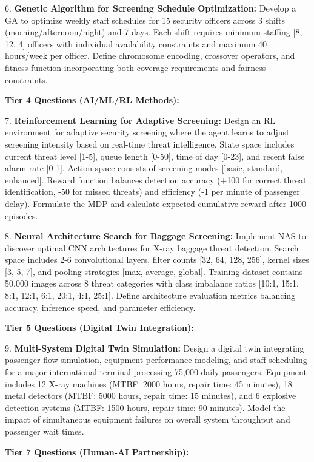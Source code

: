 \documentclass{article}
\begin{document}
6. \textbf{Genetic Algorithm for Screening Schedule Optimization:} Develop a GA to optimize weekly staff schedules for 15 security officers across 3 shifts (morning/afternoon/night) and 7 days. Each shift requires minimum staffing [8, 12, 4] officers with individual availability constraints and maximum 40 hours/week per officer. Define chromosome encoding, crossover operators, and fitness function incorporating both coverage requirements and fairness constraints.

\textbf{Tier 4 Questions (AI/ML/RL Methods):}

7. \textbf{Reinforcement Learning for Adaptive Screening:} Design an RL environment for adaptive security screening where the agent learns to adjust screening intensity based on real-time threat intelligence. State space includes current threat level [1-5], queue length [0-50], time of day [0-23], and recent false alarm rate [0-1]. Action space consists of screening modes [basic, standard, enhanced]. Reward function balances detection accuracy (+100 for correct threat identification, -50 for missed threats) and efficiency (-1 per minute of passenger delay). Formulate the MDP and calculate expected cumulative reward after 1000 episodes.

8. \textbf{Neural Architecture Search for Baggage Screening:} Implement NAS to discover optimal CNN architectures for X-ray baggage threat detection. Search space includes 2-6 convolutional layers, filter counts [32, 64, 128, 256], kernel sizes [3, 5, 7], and pooling strategies [max, average, global]. Training dataset contains 50,000 images across 8 threat categories with class imbalance ratios [10:1, 15:1, 8:1, 12:1, 6:1, 20:1, 4:1, 25:1]. Define architecture evaluation metrics balancing accuracy, inference speed, and parameter efficiency.

\textbf{Tier 5 Questions (Digital Twin Integration):}

9. \textbf{Multi-System Digital Twin Simulation:} Design a digital twin integrating passenger flow simulation, equipment performance modeling, and staff scheduling for a major international terminal processing 75,000 daily passengers. Equipment includes 12 X-ray machines (MTBF: 2000 hours, repair time: 45 minutes), 18 metal detectors (MTBF: 5000 hours, repair time: 15 minutes), and 6 explosive detection systems (MTBF: 1500 hours, repair time: 90 minutes). Model the impact of simultaneous equipment failures on overall system throughput and passenger wait times.

\textbf{Tier 7 Questions (Human-AI Partnership):}
\end{document}
